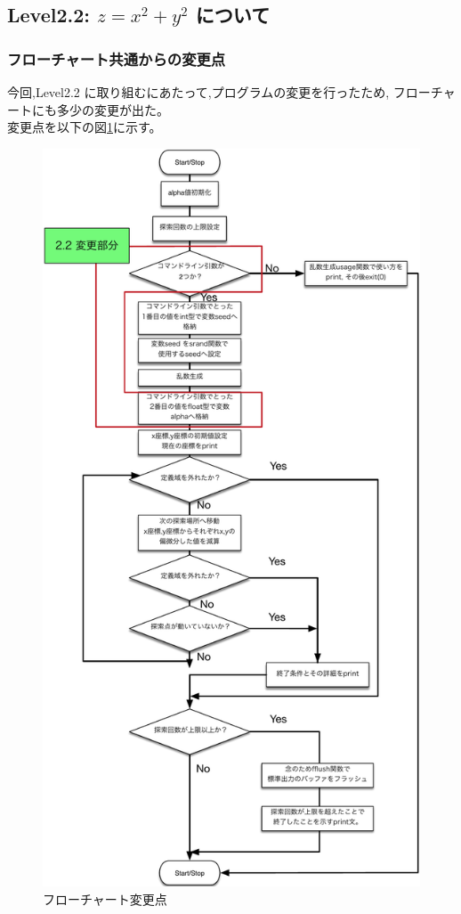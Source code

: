 \subsection{Level2.2: $z=x^2 + y^2$ について}
\subsubsection{フローチャート共通からの変更点}
今回,Level2.2 に取り組むにあたって,プログラムの変更を行ったため,
フローチャートにも多少の変更が出た。\\
変更点を以下の図\ref{flow2.2}に示す。\\
  \begin{figure}[H]
	\begin{center} %
	  \includegraphics[scale=0.45]{./flowchart2-2.pdf}
	  \caption{フローチャート変更点} %
	  \label{flow2.2} %
	\end{center}
  \end{figure}


